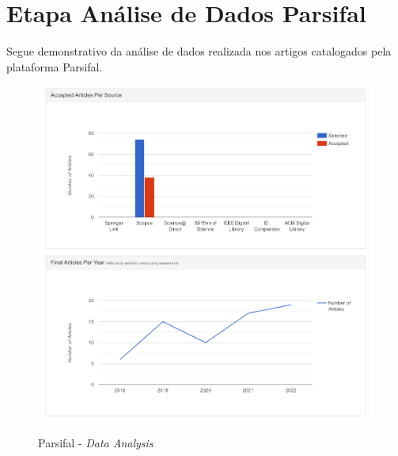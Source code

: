 {\let\clearpage\relax \chapter{\textnormal{Etapa Análise de Dados Parsifal}}}

Segue demonstrativo da análise de dados realizada nos artigos catalogados pela plataforma Parsifal.

\begin{figure}[H]
    \centering
    \caption{Parsifal - \textit{Data Analysis}}
    \includegraphics[width=16cm]{figuras/parsifalAnalysis.png} 
    \label{fig:internet} 
\end{figure}